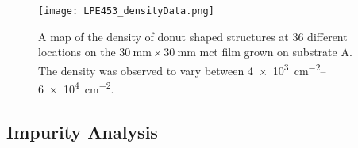 \begin{figure}[htbp]
    \centering
    \texttt{[image: LPE453\_densityData.png]}
    \caption[Map of the density of donut shaped structures on the \ac{mct} film grown on substrate A.]{A map of the density of donut shaped structures at 36 different locations on the $\SI{30}{\milli\metre}\times\SI{30}{\milli\metre}$ \ac{mct} film grown on substrate A. The density was observed to vary between \SIrange{4e+3}{6e+4}{\centi\metre^{-2}}.}
    \label{fig:LPE453_densityData}
\end{figure}


\subsection{Impurity Analysis}


